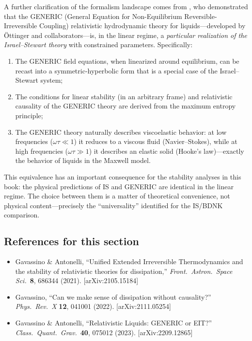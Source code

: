 A further clarification of the formalism landscape comes from
\citet{GavassinoGENERIC2023}, who demonstrated that the GENERIC
(General Equation for Non-Equilibrium Reversible-Irreversible
Coupling) relativistic hydrodynamic theory for liquids---developed
by \"Ottinger and collaborators---is, in the linear regime, a
\emph{particular realization of the Israel--Stewart theory} with
constrained parameters.  Specifically:
\begin{enumerate}
  \item The GENERIC field equations, when linearized around equilibrium,
    can be recast into a symmetric-hyperbolic form that is a special
    case of the Israel--Stewart system;
  \item The conditions for linear stability (in an arbitrary frame)
    and relativistic causality of the GENERIC theory are derived from
    the maximum entropy principle;
  \item The GENERIC theory naturally describes viscoelastic behavior:
    at low frequencies ($\omega\tau \ll 1$) it reduces to a viscous
    fluid (Navier--Stokes), while at high frequencies ($\omega\tau \gg 1$)
    it describes an elastic solid (Hooke's law)---exactly the behavior
    of liquids in the Maxwell model.
\end{enumerate}
This equivalence has an important consequence for the stability
analyses in this book: the physical predictions of IS and GENERIC
are identical in the linear regime.  The choice between them is a
matter of theoretical convenience, not physical content---precisely
the ``universality'' identified for the IS/BDNK comparison.

\subsection*{References for this section}

\begin{itemize}
  \item Gavassino \& Antonelli, ``Unified Extended Irreversible
    Thermodynamics and the stability of relativistic theories for
    dissipation,'' \textit{Front.\ Astron.\ Space Sci.}\ \textbf{8},
    686344 (2021). [arXiv:2105.15184]
  \item Gavassino, ``Can we make sense of dissipation without
    causality?'' \textit{Phys.\ Rev.\ X} \textbf{12}, 041001
    (2022). [arXiv:2111.05254]
  \item Gavassino \& Antonelli, ``Relativistic Liquids: GENERIC or
    EIT?'' \textit{Class.\ Quant.\ Grav.}\ \textbf{40}, 075012
    (2023). [arXiv:2209.12865]
\end{itemize}


